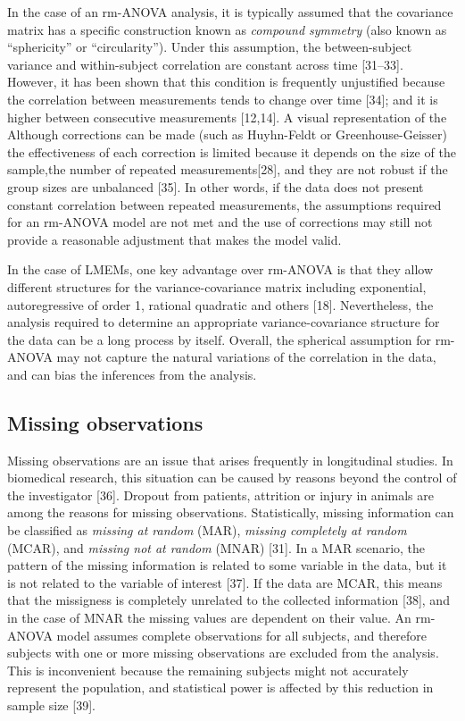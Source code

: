\documentclass[
]{article}
\begin{document}
In the case of an rm-ANOVA analysis, it is typically assumed that the covariance matrix has a specific construction known as \emph{compound symmetry} (also known as ``sphericity'' or ``circularity''). Under this assumption, the between-subject variance and within-subject correlation are constant across time {[}31--33{]}. However, it has been shown that this condition is frequently unjustified because the correlation between measurements tends to change over time {[}34{]}; and it is higher between consecutive measurements {[}12,14{]}. A visual representation of the
Although corrections can be made (such as Huyhn-Feldt or Greenhouse-Geisser) the effectiveness of each correction is limited because it depends on the size of the sample,the number of repeated measurements{[}28{]}, and they are not robust if the group sizes are unbalanced {[}35{]}. In other words, if the data does not present constant correlation between repeated measurements, the assumptions required for an rm-ANOVA model are not met and the use of corrections may still not provide a reasonable adjustment that makes the model valid.

In the case of LMEMs, one key advantage over rm-ANOVA is that they allow different structures for the variance-covariance matrix including exponential, autoregressive of order 1, rational quadratic and others {[}18{]}. Nevertheless, the analysis required to determine an appropriate variance-covariance structure for the data can be a long process by itself. Overall, the spherical assumption for rm-ANOVA may not capture the natural variations of the correlation in the data, and can bias the inferences from the analysis.

\hypertarget{missing-observations}{%
\subsection{Missing observations}\label{missing-observations}}

Missing observations are an issue that arises frequently in longitudinal studies. In biomedical research, this situation can be caused by reasons beyond the control of the investigator {[}36{]}. Dropout from patients, attrition or injury in animals are among the reasons for missing observations. Statistically, missing information can be classified as \emph{missing at random} (MAR), \emph{missing completely at random} (MCAR), and \emph{missing not at random} (MNAR) {[}31{]}. In a MAR scenario, the pattern of the missing information is related to some variable in the data, but it is not related to the variable of interest {[}37{]}. If the data are MCAR, this means that the missigness is completely unrelated to the collected information {[}38{]}, and in the case of MNAR the missing values are dependent on their value. An rm-ANOVA model assumes complete observations for all subjects, and therefore subjects with one or more missing observations are excluded from the analysis. This is inconvenient because the remaining subjects might not accurately represent the population, and statistical power is affected by this reduction in sample size {[}39{]}.
\end{document}
